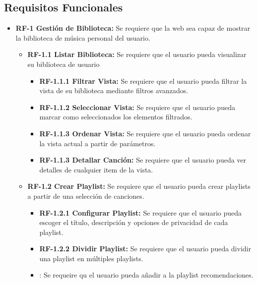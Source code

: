 \subsection{Requisitos Funcionales}\label{requisitos-funcionales}
\begin{itemize}
\tightlist

    \item
        \textbf{RF-1 Gestión de Biblioteca:} Se requiere que la web sea capaz de mostrar la biblioteca de música personal del usuario.
        \begin{itemize}
           \tightlist
           
            \item
                \textbf{RF-1.1 Listar Biblioteca:} Se requiere que el usuario pueda visualizar su biblioteca de usuario
                \begin{itemize}
                    \item
                        \textbf{RF-1.1.1 Filtrar Vista:} Se requiere que el usuario pueda filtrar la vista de su biblioteca mediante filtros avanzados.
                    \item
                        \textbf{RF-1.1.2 Seleccionar Vista:} Se requiere que el usuario pueda marcar como seleccionados los elementos filtrados.
                    \item
                        \textbf{RF-1.1.3 Ordenar Vista:} Se requiere que el usuario pueda ordenar la vista actual a partir de parámetros.
                    \item
                        \textbf{RF-1.1.3 Detallar Canción:} Se requiere que el usuario pueda ver detalles de cualquier item de la vista. 
                \end{itemize}
                
            \item
                \textbf{RF-1.2 Crear Playlist:} Se requiere que el usuario pueda crear playlists a partir de una selección de canciones.   
                \begin{itemize}
                    \item 
                        \textbf{RF-1.2.1 Configurar Playlist:} Se requiere que el usuario pueda escoger el título, descripción y opciones de privacidad de cada playlist.
                    \item 
                        \textbf{RF-1.2.2 Dividir Playlist:} Se requiere que el usuario pueda dividir una playlist en múltiples playlists.
                    \item
                        : Se requeire qu el usuario pueda añadir a la playlist recomendaciones. 
                \end{itemize}
                

\end{itemize}
\end{itemize}
